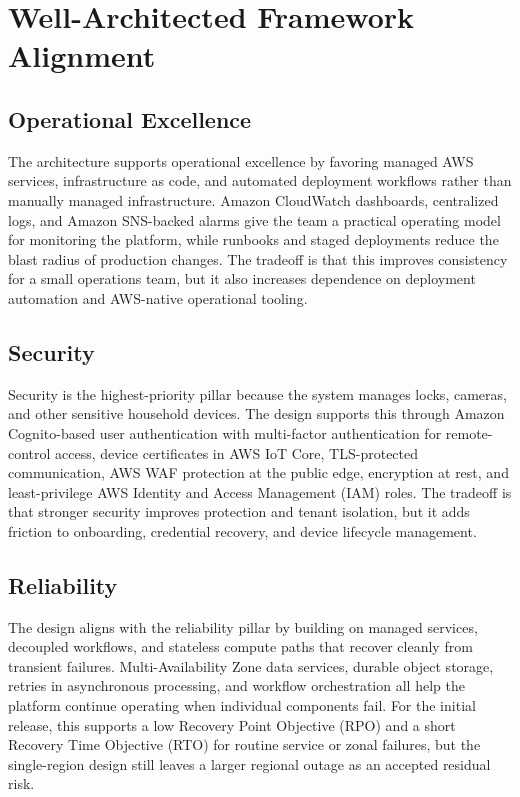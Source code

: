 \section{Well-Architected Framework Alignment}

\subsection{Operational Excellence}

The architecture supports operational excellence by favoring managed AWS services, infrastructure as code, and automated deployment workflows rather than manually managed infrastructure. Amazon CloudWatch dashboards, centralized logs, and Amazon SNS-backed alarms give the team a practical operating model for monitoring the platform, while runbooks and staged deployments reduce the blast radius of production changes. The tradeoff is that this improves consistency for a small operations team, but it also increases dependence on deployment automation and AWS-native operational tooling.

\subsection{Security}

Security is the highest-priority pillar because the system manages locks, cameras, and other sensitive household devices. The design supports this through Amazon Cognito-based user authentication with multi-factor authentication for remote-control access, device certificates in AWS IoT Core, TLS-protected communication, AWS WAF protection at the public edge, encryption at rest, and least-privilege AWS Identity and Access Management (IAM) roles. The tradeoff is that stronger security improves protection and tenant isolation, but it adds friction to onboarding, credential recovery, and device lifecycle management.

\subsection{Reliability}

The design aligns with the reliability pillar by building on managed services, decoupled workflows, and stateless compute paths that recover cleanly from transient failures. Multi-Availability Zone data services, durable object storage, retries in asynchronous processing, and workflow orchestration all help the platform continue operating when individual components fail. For the initial release, this supports a low Recovery Point Objective (RPO) and a short Recovery Time Objective (RTO) for routine service or zonal failures, but the single-region design still leaves a larger regional outage as an accepted residual risk.

